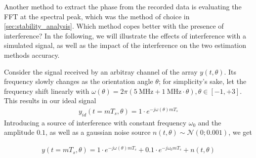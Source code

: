 Another method to extract the phase from the recorded data is evaluating the FFT at the spectral peak,
which was the method of choice in \ref{sec:stability_analysis}.
Which method copes better with the presence of interference?
In the following, we will illustrate the effects of interference with a simulated signal,
as well as the impact of the interference on the two estimation methods accuracy.

Consider the signal received by an arbitray channel of the array $y(t,\theta)$.
Its frequency slowly changes as the orientation angle $\theta$;
for simplicity's sake, let the frequency shift linearly with $\omega(\theta)=2\pi (\SI{5}{\MHz} + \SI{1}{\MHz} \cdot \theta), \theta \in [-1,+3]$.
This results in our ideal signal
\begin{align*}
  y_{id}(t=mT_s,\theta) = 1 \cdot e^{-j\omega(\theta)mT_s}
\end{align*}
Introducing a source of interference with constant frequency $\omega_0$ and the amplitude $0.1$,
as well as a gaussian noise source $n(t,\theta) \sim \mathcal{N}(0;0.001)$, we get

\begin{align*}
  y(t=mT_s,\theta) = 1 \cdot e^{-j\omega(\theta)mT_s} + 0.1 \cdot e^{-j\omega_0 mT_s} + n(t,\theta)
\end{align*}

